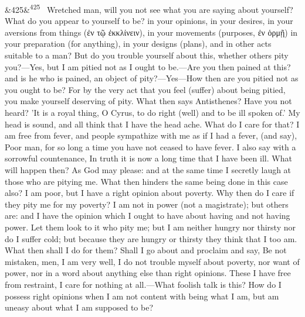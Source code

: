 \documentclass[12pt]{article}
\newcommand{\para}[1][]{\par\noindent\ifx&#1&\else\textsuperscript{\footnotesize #1}~\fi}
\begin{document}
\para[425] Wretched man, will you not see what you are saying about yourself? What do you appear to yourself to be? in your opinions, in your desires, in your aversions from things (ἐν τῷ ἐκκλίνειν), in your movements (purposes, ἐν ὁρμῇ) in your preparation (for anything), in your designs (plans), and in other acts suitable to a man? But do you trouble yourself about this, whether others pity you?—Yes, but I am pitied not as I ought to be.—Are you then pained at this? and is he who is pained, an object of pity?—Yes—How then are you pitied not as you ought to be? For by the very act that you feel (suffer) about being pitied, you make yourself deserving of pity. What then says Antisthenes? Have you not heard? 'It is a royal thing, O Cyrus, to do right (well) and to be ill spoken of.' My head is sound, and all think that I have the head ache. What do I care for that? I am free from fever, and people sympathize with me as if I had a fever, (and say), Poor man, for so long a time you have not ceased to have fever. I also say with a sorrowful countenance, In truth it is now a long time that I have been ill. What will happen then? As God may please: and at the same time I secretly laugh at those who are pitying me. What then hinders the same being done in this case also? I am poor, but I have a right opinion about poverty. Why then do I care if they pity me for my poverty? I am not in power (not a magistrate); but others are: and I have the opinion which I ought to have about having and not having power. Let them look to it who pity me; but I am neither hungry nor thirsty nor do I suffer cold; but because they are hungry or thirsty they think that I too am. What then shall I do for them? Shall I go about and proclaim and say, Be not mistaken, men, I am very well, I do not trouble myself about poverty, nor want of power, nor in a word about anything else than right opinions. These I have free from restraint, I care for nothing at all.—What foolish talk is this? How do I possess right opinions when I am not content with being what I am, but am uneasy about what I am supposed to be?
\end{document}
